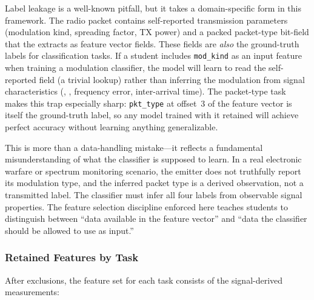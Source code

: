 \documentclass[11pt,letterpaper]{article}
\begin{document}
	\begin{tcolorbox}[infobox={Design Principle: Label Leakage in Cross-Domain Systems}]
		Label leakage is a well-known \ML{} pitfall, but it takes a domain-specific form in this framework. The radio packet contains self-reported transmission parameters (modulation kind, spreading factor, TX power) and a packed packet-type bit-field that the \FPGA{} extracts as feature vector fields. These fields are \emph{also} the ground-truth labels for classification tasks. If a student includes \texttt{mod\_kind} as an input feature when training a modulation classifier, the model will learn to read the self-reported field (a trivial lookup) rather than inferring the modulation from signal characteristics (\RSSI{}, \SNR{}, frequency error, inter-arrival time). The packet-type task makes this trap especially sharp: \texttt{pkt\_type} at offset~3 of the feature vector is itself the ground-truth label, so any model trained with it retained will achieve perfect accuracy without learning anything generalizable.

		This is more than a data-handling mistake---it reflects a fundamental misunderstanding of what the classifier is supposed to learn. In a real electronic warfare or spectrum monitoring scenario, the emitter does not truthfully report its modulation type, and the inferred packet type is a derived observation, not a transmitted label. The classifier must infer all four labels from observable signal properties. The feature selection discipline enforced here teaches students to distinguish between ``data available in the feature vector'' and ``data the classifier should be allowed to use as input.''
	\end{tcolorbox}

	\subsubsection{Retained Features by Task}

	After exclusions, the feature set for each task consists of the signal-derived measurements:
\end{document}
